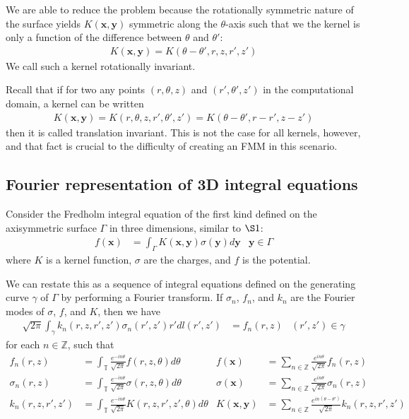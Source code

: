\documentclass[11pt, oneside]{article}   	%
\begin{document}
We are able to reduce the problem because the rotationally symmetric nature of the surface yields $K(\mathbf{x},\mathbf{y})$ symmetric along the $\theta$-axis such that we the kernel is only a function of the difference between $\theta$ and $\theta'$:
\begin{align}
K(\mathbf{x},\mathbf{y})=K(\theta-\theta',r,z,r',z')
\end{align}
We call such a kernel rotationally invariant.

Recall that if for two any points $(r,\theta,z)$ and $(r',\theta',z')$ in the computational domain, a kernel can be written
\begin{align}
K(\mathbf{x},\mathbf{y}) = K(r,\theta,z,r',\theta',z')=K(\theta-\theta',r-r',z-z')
\end{align}
then it is called translation invariant. This is not the case for all kernels, however, and that fact is crucial to the difficulty of creating an FMM in this scenario.

\subsection{Fourier representation of 3D integral equations}

Consider the Fredholm integral equation of the first kind defined on the axisymmetric surface $\Gamma$ in three dimensions, similar to $\S1$:
\begin{align}
f(\mathbf{x}) &= \int_\Gamma K(\mathbf{x},\mathbf{y})\sigma(\mathbf{y})d\mathbf{y} &\mathbf{y}\in\Gamma
\end{align}
where $K$ is a kernel function, $\sigma$ are the charges, and $f$ is the potential.

We can restate this as a sequence of integral equations defined on the generating curve $\gamma$ of $\Gamma$ by performing a Fourier transform. If $\sigma_n$, $f_n$, and $k_n$ are the Fourier modes of $\sigma$, $f$, and $K$, then we have
\begin{align}
\sqrt{2\pi}\int_\gamma k_n(r,z,r',z')\sigma_n(r',z')r'dl(r',z')&=f_n(r,z) &(r',z')\in\gamma
\end{align}
for each $n\in\mathbb{Z}$, such that
\begin{align}
f_n(r,z)&=\int_\mathbb{T}\frac{e^{-in\theta}}{\sqrt{2\pi}}f(r,z,\theta)d\theta&f(\mathbf{x})&=\sum_{n\in\mathbb{Z}}\frac{e^{in\theta}}{\sqrt{2\pi}}f_n(r,z)\\
\sigma_n(r,z)&=\int_\mathbb{T}\frac{e^{-in\theta}}{\sqrt{2\pi}}\sigma(r,z,\theta)d\theta&\sigma(\mathbf{x})&=\sum_{n\in\mathbb{Z}}\frac{e^{in\theta}}{\sqrt{2\pi}}\sigma_n(r,z)\\
k_n(r,z,r',z')&=\int_\mathbb{T}\frac{e^{-in\theta}}{\sqrt{2\pi}}K(r,z,r',z',\theta)d\theta&K(\mathbf{x},\mathbf{y})&=\sum_{n\in\mathbb{Z}}\frac{e^{in(\theta-\theta')}}{\sqrt{2\pi}}k_n(r,z,r',z')
\end{align}
\end{document}
